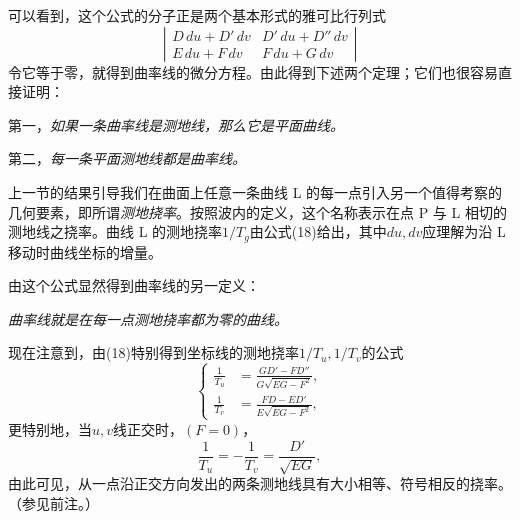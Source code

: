 可以看到，这个公式的分子正是两个基本形式的雅可比行列式
\[
 \left|\begin{matrix}
 D\,du+D'\,dv& D'\,du+D''\,dv\\
 E\,du+F\,dv& F\,du+G\,dv
 \end{matrix}\right|
\]
令它等于零，就得到曲率线的微分方程。由此得到下述两个定理；它们也很容易直接证明：

第一，\emph{如果一条曲率线是测地线，那么它是平面曲线。}

第二，\emph{每一条平面测地线都是曲率线。}

上一节的结果引导我们在曲面上任意一条曲线 L 的每一点引入另一个值得考察的几何要素，即所谓\emph{测地挠率}。按照波内的定义，这个名称表示在点 P 与 L 相切的测地线之挠率。曲线 L 的测地挠率\(1/T_g\)由公式(18)给出，其中\(du,dv\)应理解为沿 L 移动时曲线坐标的增量。

由这个公式显然得到曲率线的另一定义：

\emph{曲率线就是在每一点测地挠率都为零的曲线。}

现在注意到，由(18)特别得到坐标线的测地挠率\(1/T_u,1/T_v\)的公式
\begin{equation}\tag{19}
\left\{\begin{aligned}
 \frac1{T_u}&=\frac{GD'-FD''}{G\sqrt{EG-F^2}},\\
 \frac1{T_v}&=\frac{FD-ED'}{E\sqrt{EG-F^2}},
\end{aligned}\right.
\end{equation}
更特别地，当\(u,v\)线正交时，\((F=0)\)，
\begin{equation}\tag{19*}
 \frac1{T_u}=-\frac1{T_v}=\frac{D'}{\sqrt{EG}},
\end{equation}
由此可见，从一点沿正交方向发出的两条测地线具有大小相等、符号相反的挠率。（参见前注。）

